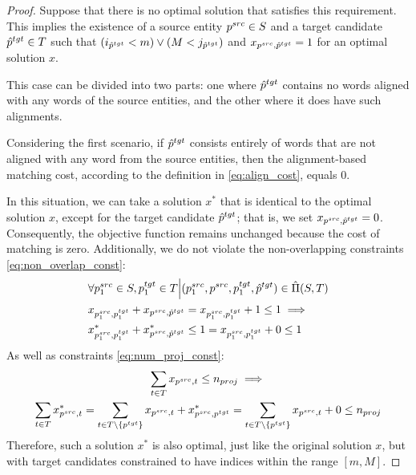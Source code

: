 \begin{proof}
  Suppose that there is no optimal solution that satisfies this requirement.
  This implies the existence of a source entity \( p^{src} \in S \) and a target
  candidate \( \hat{p}^{tgt} \in T \) such that \( (i_{\hat{p}^{tgt}} < m) \lor (M < j_{\hat{p}^{tgt}}) \)
  and \( x_{p^{src}, \hat{p}^{tgt}} = 1 \) for an optimal solution \( x \).

  This case can be divided into two parts: one where \( \hat{p}^{tgt} \) contains
  no words aligned with any words of the source entities, and the other where it
  does have such alignments.

  Considering the first scenario, if \( \hat{p}^{tgt} \) consists entirely of
  words that are not aligned with any word from the source entities, then the
  alignment-based matching cost, according to the definition in \eqref{eq:align_cost},
  equals \( 0 \).

  In this situation, we can take a solution \( x^* \) that is identical to the
  optimal solution \( x \), except for the target candidate \( \hat{p}^{tgt} \);
  that is, we set \( x_{p^{src}, \hat{p}^{tgt}} = 0 \). Consequently, the objective
  function remains unchanged because the cost of matching is zero. Additionally,
  we do not violate the non-overlapping constraints \eqref{eq:non_overlap_const}:
  \begin{align*}
    & \forall p_1^{src} \in S, p_1^{tgt} \in T \Big| (p_1^{src}, p^{src}, p_1^{tgt}, \hat{p}^{tgt}) \in \hat{\Pi}(S, T) \\
    & x_{p_1^{src}, p_1^{tgt}} + x_{p^{src}, \hat{p}^{tgt}} =
    x_{p_1^{src}, p_1^{tgt}} + 1 \leq 1 \implies                                                                         \\
    & x^*_{p_1^{src}, p_1^{tgt}} + x^*_{p^{src}, \hat{p}^{tgt}} \leq 1 =
    x_{p_1^{src}, p_1^{tgt}} + 0 \leq 1
  \end{align*}
  As well as constraints \eqref{eq:num_proj_const}:
  \begin{multline*}
    \sum\limits_{t \in T} x_{p^{src}, t} \leq n_{proj} \implies                             \\
    \sum\limits_{t \in T} x^*_{p^{src}, t} =
    \sum\limits_{t \in T \setminus \{ p^{tgt} \}} x_{p^{src}, t} + x^*_{p^{src}, p^{tgt}} =
    \sum\limits_{t \in T \setminus \{ p^{tgt} \}} x_{p^{src}, t} + 0 \leq n_{proj}
  \end{multline*}
  Therefore, such a solution \( x^* \) is also optimal, just like the original solution \( x \),
  but with target candidates constrained to have indices within the range \( [m, M] \).


\end{proof}
